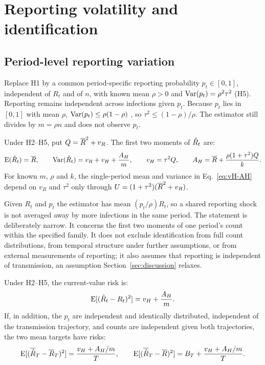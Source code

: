 \section{Reporting volatility and identification}
\label{sec:reporting}

\subsection{Period-level reporting variation}
\label{sec:reporting-volatility}

Replace H1 by a common period-specific reporting probability $p_t\in[0,1]$, independent of $R_t$ and of $n$, with known mean $\rho>0$ and $\operatorname{Var}(p_t)=\rho^2\tau^2$ (H5). Reporting remains independent across infections given $p_t$. Because $p_t$ lies in $[0,1]$ with mean $\rho$, $\operatorname{Var}(p_t)\le\rho(1-\rho)$ \citep{bhatia2000better}, so $\tau^2\le(1-\rho)/\rho$. The estimator still divides by $m=\rho n$ and does not observe $p_t$.

\begin{proposition}
\label{prop:report-noise}
Under H2--H5, put $Q=\overline{R}^2+v_R$. The first two moments of $\hat R_t$ are:
\begin{equation}
  \operatorname{E}(\hat R_t)=\overline{R},\qquad
  \operatorname{Var}(\hat R_t)=v_R+v_H+\frac{A_H}{m},\qquad
  v_H=\tau^2Q,\qquad
  A_H=\overline{R}+\frac{\rho(1+\tau^2)Q}{k}.
  \label{eq:vH-AH}
\end{equation}
For known $m$, $\rho$ and $k$, the single-period mean and variance in Eq.~\eqref{eq:vH-AH} depend on $v_R$ and $\tau^2$ only through $U=(1+\tau^2)(\overline{R}^2+v_R)$.
\end{proposition}

Given $R_t$ and $p_t$ the estimator has mean $(p_t/\rho)R_t$, so a shared reporting shock is not averaged away by more infections in the same period. The statement is deliberately narrow. It concerns the first two moments of one period's count within the specified family. It does not exclude identification from full count distributions, from temporal structure under further assumptions, or from external measurements of reporting; it also assumes that reporting is independent of transmission, an assumption Section~\ref{sec:discussion} relaxes.

\begin{corollary}
\label{cor:report-current}
Under H2--H5, the current-value risk is:
\begin{equation}
  \operatorname{E}[(\hat R_t-R_t)^2]=v_H+\frac{A_H}{m}.
  \label{eq:vH-current}
\end{equation}
If, in addition, the $p_t$ are independent and identically distributed, independent of the transmission trajectory, and counts are independent given both trajectories, the two mean targets have risks:
\begin{equation}
  \operatorname{E}[(\overline{\hat R}_T-\overline{R}_T)^2]=\frac{v_H+A_H/m}{T},\qquad
  \operatorname{E}[(\overline{\hat R}_T-\overline{R})^2]=B_T+\frac{v_H+A_H/m}{T}.
  \label{eq:report-means}
\end{equation}
\end{corollary}

